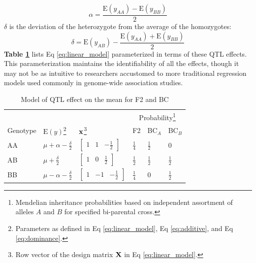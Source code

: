 \begin{equation}
	\alpha = \frac{\text{E}(y_{AA}) - \text{E}(y_{BB})}{2}
    \label{eq:additive}
\end{equation}
 $\delta$ is the deviation of the heterozygote from the average of the homozygotes:
 \begin{equation}
 	\delta = \text{E}(y_{AB}) - \frac{\text{E}(y_{AA}) + \text{E}(y_{BB})}{2}
    \label{eq:dominance}
\end{equation}
\textbf{Table \ref{tab:qtl_mean_model}} lists Eq \ref{eq:linear_model} parameterized in terms of these QTL effects. This parameterization maintains the identifiability of all the effects, though it may not be as intuitive to researchers accustomed to more traditional regression models used commonly in genome-wide association studies.

\begin{table}
\renewcommand{\familydefault}{\sfdefault}\normalfont
\begin{minipage}{\textwidth}
\centering
\caption{Model of QTL effect on the mean for F2 and BC
\label{tab:qtl_mean_model}}
\end{minipage}
\begin{minipage}{\textwidth}
\begin{tabularx}{\textwidth}{XXXXXX}
\hline
& & & \multicolumn{3}{c}{Probability\footnote{Mendelian inheritance probabilities based on independent assortment of alleles $A$ and $B$ for specified bi-parental cross.}} \\ \cline{4-6}
Genotype & 
$\text{E}(y)$\footnote{Parameters as defined in Eq \ref{eq:linear_model}, Eq \ref{eq:additive}, and Eq \ref{eq:dominance}.} & 
$\mathbf{x}$\footnote{Row vector of the design matrix $\mathbf{X}$ in Eq \ref{eq:linear_model}.} 
& F2 & BC$_{A}$ & BC$_{B}$ \\
\hline
AA & $\mu + \alpha - \frac{\delta}{2}$ & $\left[\begin{array}{ccc} 1 & 1 & -\frac{1}{2}  \end{array}\right]$ & $\frac{1}{4}$ & $\frac{1}{2}$ & $0$ \\
AB & $\mu + \frac{\delta}{2}$ & $\left[\begin{array}{ccc} 1 & 0 & \frac{1}{2}  \end{array}\right]$ & $\frac{1}{2}$ & $\frac{1}{2}$ & $\frac{1}{2}$ \\
BB & $\mu - \alpha - \frac{\delta}{2}$ & $\left[\begin{array}{ccc} 1 & -1 & -\frac{1}{2}  \end{array}\right]$ & $\frac{1}{4}$ & $0$ & $\frac{1}{2}$ \\
\hline
\end{tabularx}
\end{minipage}
\end{table}

